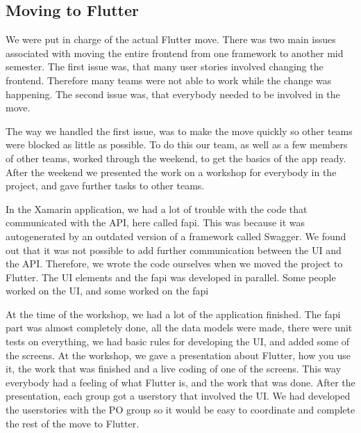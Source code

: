 \subsection{Moving to Flutter}
We were put in charge of the actual Flutter move. 
There was two main issues associated with moving the entire frontend from one framework to another mid semester.
The first issue was, that many user stories involved changing the frontend. Therefore many teams were not able to work while the change was happening.
The second issue was, that everybody needed to be involved in the move. 

The way we handled the first issue, was to make the move quickly so other teams were blocked as little as possible.
To do this our team, as well as a few members of other teams, worked through the weekend, to get the basics of the app ready. After the weekend we presented the work on a workshop for everybody in the project, and gave further tasks to other teams.

In the Xamarin application, we had a lot of trouble with the code that communicated with the API, here called \gls{fapi}. This was because it was autogenerated by an outdated version of a framework called Swagger. We found out that it was not possible to add further communication between the UI and the API. Therefore, we wrote the code ourselves when we moved the project to Flutter. The UI elements and the \gls{fapi} was developed in parallel. Some people worked on the UI, and some worked on the \gls{fapi}

At the time of the workshop, we had a lot of the application finished. The \gls{fapi} part was almost completely done, all the data models were made, there were unit tests on everything, we had basic rules for developing the UI, and added some of the screens. 
At the workshop, we gave a presentation about Flutter, how you use it, the work that was finished and a live coding of one of the screens. This way everybody had a feeling of what Flutter is, and the work that was done. 
After the presentation, each group got a userstory that involved the UI. We had developed the userstories with the \gls{PO} group so it would be easy to coordinate and complete the rest of the move to Flutter.
